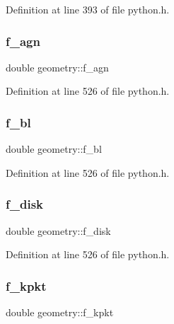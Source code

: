 Definition at line 393 of file python.\+h.

\mbox{\label{structgeometry_aef1dd41638758c1e64895dbb2dfabb8e}} 
\subsubsection{\texorpdfstring{f\+\_\+agn}{f\_agn}}
{\footnotesize\ttfamily double geometry\+::f\+\_\+agn}



Definition at line 526 of file python.\+h.

\mbox{\label{structgeometry_ae7f71e5cf3066453c7a1aab90d32872c}} 
\subsubsection{\texorpdfstring{f\+\_\+bl}{f\_bl}}
{\footnotesize\ttfamily double geometry\+::f\+\_\+bl}



Definition at line 526 of file python.\+h.

\mbox{\label{structgeometry_a680f63b1b2306f462005771b7328c31d}} 
\subsubsection{\texorpdfstring{f\+\_\+disk}{f\_disk}}
{\footnotesize\ttfamily double geometry\+::f\+\_\+disk}



Definition at line 526 of file python.\+h.

\mbox{\label{structgeometry_aee1ef1073728c7cec8e60640e26270ca}} 
\subsubsection{\texorpdfstring{f\+\_\+kpkt}{f\_kpkt}}
{\footnotesize\ttfamily double geometry\+::f\+\_\+kpkt}



